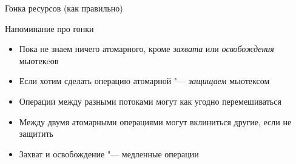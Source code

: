 \begin{frame}[t,fragile]{Гонка ресурсов (как правильно)}
\end{frame}

\begin{frame}[t]{Напоминание про гонки}
	\begin{itemize}
		\item Пока не знаем ничего атомарного, кроме \textit{захвата} или \textit{освобождения} мьютекcов
		\item Если хотим сделать операцию атомарной "--- \textit{защищаем} мьютексом
		\item Операции между разными потоками могут как угодно перемешиваться
		\item Между двумя атомарными операциями могут вклиниться другие, если не защитить
		\item Захват и освобождение "--- медленные операции
	\end{itemize}
\end{frame}
